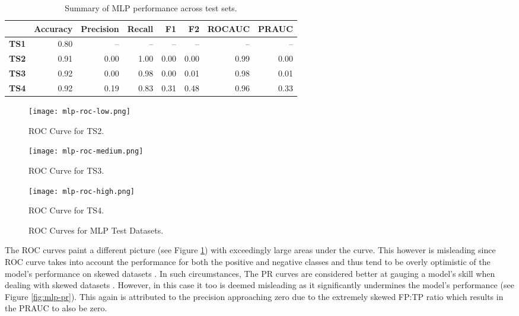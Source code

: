 \begin{table}[htb]
  \centering
  \caption{Summary of MLP performance across test sets.}
    \begin{tabular}{rrrrrrrr}
      \hline
      & Accuracy & Precision & Recall & F1 & F2 & ROCAUC & PRAUC \\
      \hline
      \textbf{TS1} & 0.80 & -- & -- & -- & -- & -- & -- \\
      \textbf{TS2} & 0.91 & 0.00 & 1.00 & 0.00 & 0.00 & 0.99 & 0.00 \\
      \textbf{TS3} & 0.92 & 0.00 & 0.98 & 0.00 & 0.01 & 0.98 & 0.01 \\
      \textbf{TS4} & 0.92 & 0.19 & 0.83 & 0.31 & 0.48 & 0.96 & 0.33 \\
      \hline
    \end{tabular}
    \label{tab:mlp-results}
\end{table}

\begin{figure}[htb]
  \centering
  \begin{minipage}{0.32\textwidth}
    \centering
    \texttt{[image: mlp-roc-low.png]}
    \caption{ROC Curve for TS2.}
  \end{minipage}
  \begin{minipage}{0.32\textwidth}
    \centering
    \texttt{[image: mlp-roc-medium.png]}
    \caption{ROC Curve for TS3.}
  \end{minipage}
  \begin{minipage}{0.32\textwidth}
    \centering
    \texttt{[image: mlp-roc-high.png]}
    \caption{ROC Curve for TS4.}
  \end{minipage}
  \caption{ROC Curves for MLP Test Datasets.}
  \label{fig:mlp-roc}
\end{figure}

The ROC curves paint a different picture (see Figure
\ref{fig:mlp-roc}) with exceedingly large areas under the curve. This
however is misleading since ROC curve takes into account the
performance for both the positive and negative classes and thus tend
to be overly optimistic of the model's performance on skewed datasets
\cite{branco2015survey,fernandez2018learning}. In such circumstances,
The PR curves are considered better at gauging a model's skill when
dealing with skewed datasets \cite{branco2015survey}. However, in this
case it too is deemed misleading as it significantly undermines the
model's performance (see Figure \ref{fig:mlp-pr}). This again is
attributed to the precision approaching zero due to the extremely
skewed FP:TP ratio which results in the PRAUC to also be zero.

